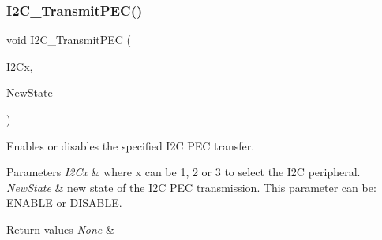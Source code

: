 \subsubsection{\texorpdfstring{I2\+C\+\_\+\+Transmit\+P\+E\+C()}{I2C\_TransmitPEC()}}
{\footnotesize\ttfamily void I2\+C\+\_\+\+Transmit\+P\+EC (\begin{DoxyParamCaption}\item[{I2\+C\+\_\+\+Type\+Def $\ast$}]{I2\+Cx,  }\item[{Functional\+State}]{New\+State }\end{DoxyParamCaption})}



Enables or disables the specified I2C P\+EC transfer. 


\begin{DoxyParams}{Parameters}
{\em I2\+Cx} & where x can be 1, 2 or 3 to select the I2C peripheral. \\
\hline
{\em New\+State} & new state of the I2C P\+EC transmission. This parameter can be\+: E\+N\+A\+B\+LE or D\+I\+S\+A\+B\+LE. \\
\hline
\end{DoxyParams}

\begin{DoxyRetVals}{Return values}
{\em None} & \\
\hline
\end{DoxyRetVals}
